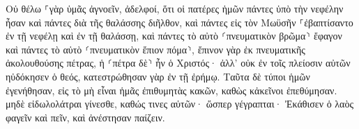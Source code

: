 \documentclass{openreader}
\begin{document}
Οὐ θέλω ⸀γὰρ ὑμᾶς ἀγνοεῖν, ἀδελφοί, ὅτι οἱ πατέρες ἡμῶν πάντες ὑπὸ τὴν νεφέλην ἦσαν καὶ πάντες διὰ τῆς θαλάσσης διῆλθον, 
καὶ πάντες εἰς τὸν Μωϋσῆν ⸀ἐβαπτίσαντο ἐν τῇ νεφέλῃ καὶ ἐν τῇ θαλάσσῃ, 
καὶ πάντες τὸ αὐτὸ ⸂πνευματικὸν βρῶμα⸃ ἔφαγον 
καὶ πάντες τὸ αὐτὸ ⸂πνευματικὸν ἔπιον πόμα⸃, ἔπινον γὰρ ἐκ πνευματικῆς ἀκολουθούσης πέτρας, ἡ ⸂πέτρα δὲ⸃ ἦν ὁ Χριστός· 
ἀλλ’ οὐκ ἐν τοῖς πλείοσιν αὐτῶν ηὐδόκησεν ὁ θεός, κατεστρώθησαν γὰρ ἐν τῇ ἐρήμῳ. 
Ταῦτα δὲ τύποι ἡμῶν ἐγενήθησαν, εἰς τὸ μὴ εἶναι ἡμᾶς ἐπιθυμητὰς κακῶν, καθὼς κἀκεῖνοι ἐπεθύμησαν. 
μηδὲ εἰδωλολάτραι γίνεσθε, καθώς τινες αὐτῶν· ὥσπερ γέγραπται· Ἐκάθισεν ὁ λαὸς φαγεῖν καὶ πεῖν, καὶ ἀνέστησαν παίζειν. 
\end{document}
